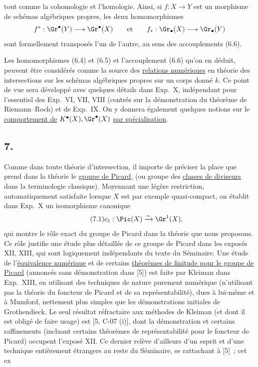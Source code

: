 tout comme la cohomologie et l'homologie. Ainsi, si $f:X\to Y$ est un morphisme de sch\'emas alg\'ebriques propres, les deux homomorphismes
\[
f^*:\Gr^\bullet(Y)\longrightarrow \Gr^\bullet(X)\qquad\text{et}\qquad f_*:\Gr_\bullet(X)\longrightarrow \Gr_\bullet(Y)
\]
sont formellement transpos\'es l'un de l'autre, au sens des accouplements (6.6).

Les homomorphismes (6.4) et (6.5) et l'accouplement (6.6) qu'on en d\'eduit, peuvent \^etre consid\'er\'es comme la source des \uline{relations num\'eriques} en th\'eorie des intersections sur les sch\'emas alg\'ebriques propres sur un corps donn\'e $k$. Ce point de vue sera d\'evelopp\'e avec quelques d\'etails dans Exp.\ X, ind\'ependant pour l'essentiel des Exp.\ VI, VII, VIII (centr\'es sur la d\'emonstration du th\'eor\`eme de Riemann--Roch) et de Exp.\ IX. On y donnera \'egalement quelques notions sur le \uline{comportement de} $K^\bullet(X),\Gr^\bullet(X)$ \uline{par sp\'ecialisation}.

\subsection*{7.}
Comme dans toute th\'eorie d'intersection, il importe de pr\'eciser la place que prend dans la th\'eorie le \uline{groupe de Picard}, (ou groupe des \uline{classes de diviseurs} dans la terminologie classique). Moyennant une l\'eg\`ere restriction, automatiquement satisfaite lorsque $X$ est par exemple quasi-compact, on \'etablit dans Exp.\ X un isomorphisme canonique
\begin{equation}\tag{7.1}
c_1:\Pic(X)\xrightarrow{\sim}\Gr^1(X),
\end{equation}
qui montre le r\^ole exact du groupe de Picard dans la th\'eorie que nous proposons. Ce r\^ole justifie une \'etude plus d\'etaill\'ee de ce groupe de Picard dans les expos\'es XII, XIII, qui sont logiquement ind\'ependants du texte du S\'eminaire. Une \'etude de l'\uline{\'equivalence num\'erique} et de certains \uline{th\'eor\`emes de finitude pour le groupe de Picard} (annonc\'es sans d\'emonstration dans [5]) est faite par Kleiman dans Exp.\ XIII, en utilisant des techniques de nature purement num\'erique (n'utilisant pas la th\'eorie du foncteur de Picard et de sa repr\'esentabilit\'e), dues \`a lui-m\^eme et \`a Mumford, nettement plus simples que les d\'emonstrations initiales de Grothendieck. Le seul r\'esultat r\'efractaire aux m\'ethodes de Kleiman (et dont il est oblig\'e de faire usage) est [5, C-07 (i)], dont la d\'emonstration et certains raffinements (incluant certains th\'eor\`emes de repr\'esentabilit\'e pour le foncteur de Picard) occupent l'expos\'e XII. Ce dernier rel\`eve d'ailleurs d'un esprit et d'une technique enti\`erement \'etrangers au reste du S\'eminaire, se rattachant \`a [5]~; cet ex%
